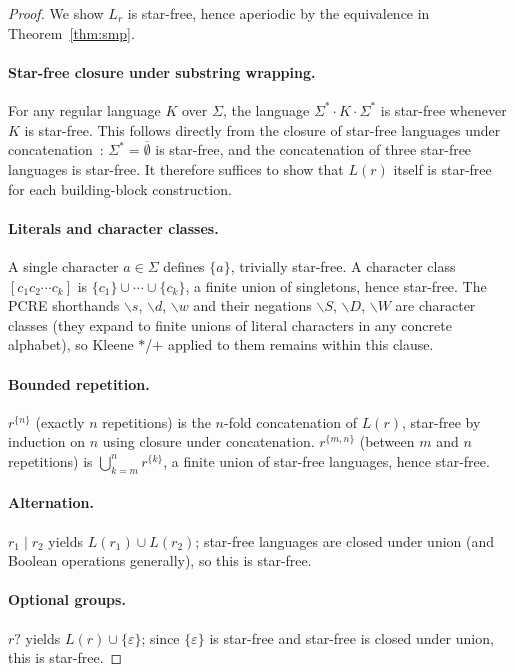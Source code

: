 \documentclass[letterpaper,twocolumn,10pt]{article}
\theoremstyle{definition}
\theoremstyle{remark}
\begin{document}
\begin{proof}
We show $L_r$ is star-free, hence aperiodic by the equivalence in
Theorem~\ref{thm:smp}.

\paragraph{Star-free closure under substring wrapping.}
For any regular language $K$ over $\Sigma$, the language
$\Sigma^* \cdot K \cdot \Sigma^*$ is star-free whenever $K$ is star-free.
This follows directly from the closure of star-free languages under
concatenation~\cite{pin1986}: $\Sigma^* = \overline{\emptyset}$ is star-free,
and the concatenation of three star-free languages is star-free.
It therefore suffices to show that $L(r)$ itself is star-free for each
building-block construction.

\paragraph{Literals and character classes.}
A single character $a \in \Sigma$ defines $\{a\}$, trivially star-free.
A character class $[c_1 c_2 \cdots c_k]$ is $\{c_1\} \cup \cdots \cup \{c_k\}$,
a finite union of singletons, hence star-free.
The PCRE shorthands $\backslash s$, $\backslash d$, $\backslash w$ and their
negations $\backslash S$, $\backslash D$, $\backslash W$ are character classes
(they expand to finite unions of literal characters in any concrete alphabet),
so Kleene $*$/$+$ applied to them remains within this clause.

\paragraph{Bounded repetition.}
$r^{\{n\}}$ (exactly $n$ repetitions) is the $n$-fold concatenation of $L(r)$,
star-free by induction on $n$ using closure under concatenation.
$r^{\{m,n\}}$ (between $m$ and $n$ repetitions) is $\bigcup_{k=m}^{n} r^{\{k\}}$,
a finite union of star-free languages, hence star-free.

\paragraph{Alternation.}
$r_1 \mid r_2$ yields $L(r_1) \cup L(r_2)$; star-free languages are closed under
union (and Boolean operations generally), so this is star-free.

\paragraph{Optional groups.}
$r?$ yields $L(r) \cup \{\varepsilon\}$; since $\{\varepsilon\}$ is star-free and
star-free is closed under union, this is star-free.


\end{proof}
\end{document}
